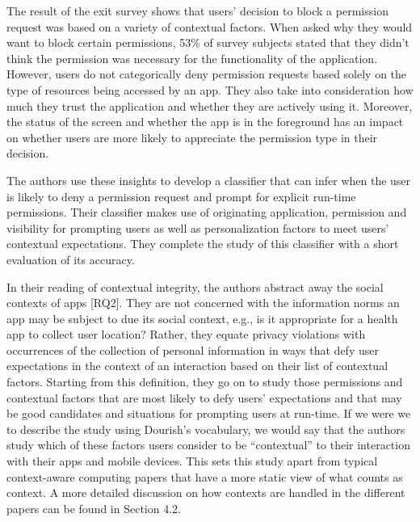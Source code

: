 \documentclass[../thesis.tex]{subfiles}
\begin{document}
\bigskip

\textcolor[rgb]{0.2,0.2,0.2}{The result of the exit survey shows that
users' decision to block a permission request was based
on a variety of contextual factors. }When asked why they would want to
block certain permissions, 53\% of survey subjects stated that they
didn't think the permission was necessary for the
functionality of the application. However,
\textcolor[rgb]{0.2,0.2,0.2}{users do not categorically deny permission
requests based solely on the type of resources being accessed by an
app. They also take into consideration how much they trust the
application and whether they are actively using it. Moreover, the
status of the screen and whether the app is in the foreground has an
impact on whether users are more likely to appreciate the permission
type in their decision. }


\bigskip

\textcolor[rgb]{0.2,0.2,0.2}{The authors use these insights to develop a
classifier that can infer when the user is likely to deny a permission
request and prompt for explicit run-time permissions. Their classifier
makes use of originating application, permission and visibility for
prompting users as well as personalization factors to meet
users' contextual expectations. They complete the study
of this classifier with a short evaluation of its accuracy.}

\textcolor[rgb]{0.2,0.2,0.2}{In their reading of contextual integrity,
the authors abstract away the social contexts of apps [RQ2]. They are
not concerned with the information norms an app may be subject to due
its social context, e.g., is it appropriate for a health app to collect
user location? Rather, they equate privacy violations with occurrences
of the collection of personal information in ways that defy user
expectations in the context of an interaction based on their list of
contextual factors. Starting from this definition, they go on to study
those permissions and contextual factors that are most likely to defy
users' expectations and that may be good candidates and
situations for prompting users at run-time. }If we were we to describe
the study using Dourish's vocabulary, we would say that
the authors study which of these factors users consider to be
``contextual'' to their interaction
with their apps and mobile devices. This sets this study apart from
typical context-aware computing papers that have a more static view of
what counts as context. A more detailed discussion on how contexts are
handled in the different papers can be found in Section
\textcolor[rgb]{0.2,0.2,0.2}{4.2.}
\end{document}

